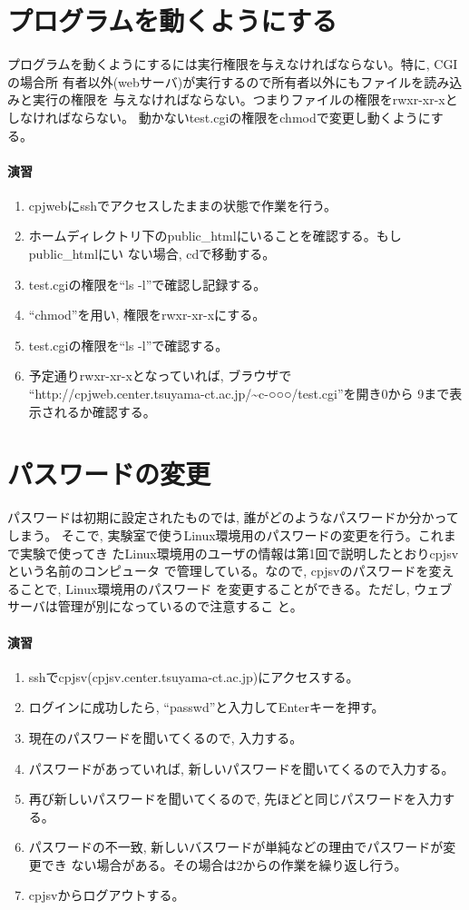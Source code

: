 \section{プログラムを動くようにする}
プログラムを動くようにするには実行権限を与えなければならない。特に, CGIの場合所
有者以外(webサーバ)が実行するので所有者以外にもファイルを読み込みと実行の権限を
与えなければならない。つまりファイルの権限をrwxr-xr-xとしなければならない。
動かないtest.cgiの権限をchmodで変更し動くようにする。

\paragraph{演習}
\begin{enumerate}
\item cpjwebにsshでアクセスしたままの状態で作業を行う。
\item ホームディレクトリ下のpublic\_htmlにいることを確認する。もしpublic\_htmlにい
      ない場合, cdで移動する。
\item test.cgiの権限を``ls -l''で確認し記録する。
\item ``chmod''を用い, 権限をrwxr-xr-xにする。
\item test.cgiの権限を``ls -l''で確認する。
\item 予定通りrwxr-xr-xとなっていれば, ブラウザで
      ``http://cpjweb.center.tsuyama-ct.ac.jp/\~{}c-○○○/test.cgi''を開き0から
      9まで表示されるか確認する。
\end{enumerate}

\section{パスワードの変更}
パスワードは初期に設定されたものでは, 誰がどのようなパスワードか分かってしまう。
そこで, 実験室で使うLinux環境用のパスワードの変更を行う。これまで実験で使ってき
たLinux環境用のユーザの情報は第1回で説明したとおりcpjsvという名前のコンピュータ
で管理している。なので, cpjsvのパスワードを変えることで, Linux環境用のパスワード
を変更することができる。ただし, ウェブサーバは管理が別になっているので注意するこ
と。

\paragraph{演習}
\begin{enumerate}
\item sshでcpjsv(cpjsv.center.tsuyama-ct.ac.jp)にアクセスする。
\item ログインに成功したら, ``passwd''と入力してEnterキーを押す。
\item 現在のパスワードを聞いてくるので, 入力する。
\item パスワードがあっていれば, 新しいパスワードを聞いてくるので入力する。
\item 再び新しいパスワードを聞いてくるので, 先ほどと同じパスワードを入力する。
\item パスワードの不一致, 新しいバスワードが単純などの理由でパスワードが変更でき
      ない場合がある。その場合は2からの作業を繰り返し行う。
\item cpjsvからログアウトする。
\end{enumerate}


